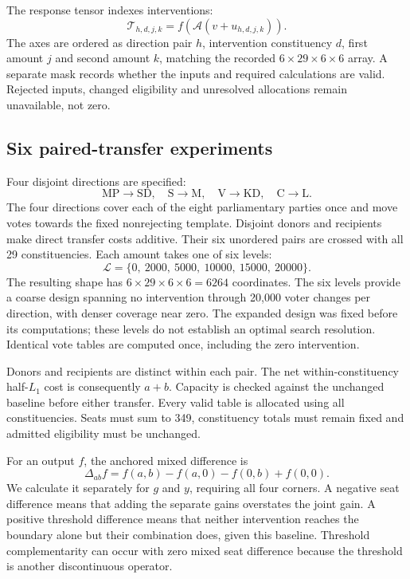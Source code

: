 \documentclass[11pt,a4paper]{article}
\begin{document}
The response tensor indexes interventions:
\[
\mathcal T_{h,d,j,k}
=f\!\left(\mathcal A(v+u_{h,d,j,k})\right).
\]
The axes are ordered as direction pair \(h\), intervention constituency \(d\), first amount \(j\) and second amount \(k\), matching the recorded \(6\times29\times6\times6\) array. A separate mask records whether the inputs and required calculations are valid. Rejected inputs, changed eligibility and unresolved allocations remain unavailable, not zero.

\subsection{Six paired-transfer experiments}

Four disjoint directions are specified:
\[
\mathrm{MP}\to\mathrm{SD},\quad
\mathrm{S}\to\mathrm{M},\quad
\mathrm{V}\to\mathrm{KD},\quad
\mathrm{C}\to\mathrm{L}.
\]
The four directions cover each of the eight parliamentary parties once and move votes towards the fixed nonrejecting template. Disjoint donors and recipients make direct transfer costs additive. Their six unordered pairs are crossed with all 29 constituencies. Each amount takes one of six levels:
\[
\mathcal L=\{0,\ 2000,\ 5000,\ 10000,\ 15000,\ 20000\}.
\]
The resulting shape has \(6\times29\times6\times6=6264\) coordinates. The six levels provide a coarse design spanning no intervention through 20,000 voter changes per direction, with denser coverage near zero. The expanded design was fixed before its computations; these levels do not establish an optimal search resolution. Identical vote tables are computed once, including the zero intervention.

Donors and recipients are distinct within each pair. The net within-constituency half-\(L_1\) cost is consequently \(a+b\). Capacity is checked against the unchanged baseline before either transfer. Every valid table is allocated using all constituencies. Seats must sum to 349, constituency totals must remain fixed and admitted eligibility must be unchanged.

For an output \(f\), the anchored mixed difference is
\[
\Delta_{ab}f=f(a,b)-f(a,0)-f(0,b)+f(0,0).
\]
We calculate it separately for \(g\) and \(y\), requiring all four corners. A negative seat difference means that adding the separate gains overstates the joint gain. A positive threshold difference means that neither intervention reaches the boundary alone but their combination does, given this baseline. Threshold complementarity can occur with zero mixed seat difference because the threshold is another discontinuous operator.
\end{document}
